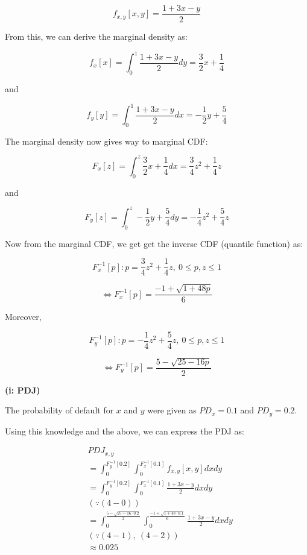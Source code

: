\documentclass[11pt]{article}
\renewcommand\part[1]{\vspace{.10in}\textbf{(#1)}}
\begin{document}
\begin{equation} \tag{4 - 0}
f_{x, y}[x, y] = \frac{1 + 3x - y}{2}
\end{equation}

From this, we can derive the marginal density as:

$$
f_x[x] = \int_0^1 \frac{1 + 3x - y}{2} dy
= \frac{3}{2} x + \frac{1}{4}
$$

and

$$
f_y[y] = \int_0^1 \frac{1 + 3x - y}{2} dx
= -\frac{1}{2} y + \frac{5}{4}
$$

The marginal density now gives way to marginal CDF:

$$
F_x[z] = \int_0^z \frac{3}{2} x + \frac{1}{4} dx
= \frac{3}{4} z^2 + \frac{1}{4} z
$$

and

$$
F_y[z] = \int_0^z -\frac{1}{2} y + \frac{5}{4} dy
= -\frac{1}{4} z^2 + \frac{5}{4} z
$$

Now from the marginal CDF, we get get the inverse CDF 
(quantile function) as:

$$
F^{-1}_x[p]:
p = \frac{3}{4} z^2 + \frac{1}{4} z, \
0 \leq p, z \leq 1
$$

\begin{equation} \tag{4 - 1}
\Leftrightarrow
F^{-1}_x[p] =
\frac{-1 + \sqrt{1 + 48p}}{6}
\end{equation}

\newpage

Moreover,

$$
F^{-1}_y[p]:
p = -\frac{1}{4} z^2 + \frac{5}{4} z, \
0 \leq p, z \leq 1
$$

\begin{equation} \tag{4 - 2}
\Leftrightarrow
F^{-1}_y[p] =
\frac{5 - \sqrt{25 - 16p}}{2}
\end{equation}

\part{i: PDJ}

The probability of default for $x$ and $y$ were given as
$PD_x = 0.1$ and $PD_y = 0.2$.

Using this knowledge and the above, we can express the PDJ as:

$$
\begin{aligned}
&PDJ_{x, y} \\
&= \int_0^{F^{-1}_y[0.2]}
\int_0^{F^{-1}_x[0.1]}
f_{x, y}[x, y] dx dy \\
&= \int_0^{F^{-1}_y[0.2]}
\int_0^{F^{-1}_x[0.1]}
\frac{1 + 3x - y}{2} dx dy \\
&(\because (4 - 0)) \\
&= \int_0^{\frac{5 - \sqrt{25 - 16 \cdot 0.2}}{2}}
\int_0^{\frac{-1 + \sqrt{1 + 48 \cdot 0.1}}{6}}
\frac{1 + 3x - y}{2} dx dy \\
&(\because (4 - 1), \ (4 - 2)) \\
& \approx 0.025
\end{aligned}
$$
\end{document}
